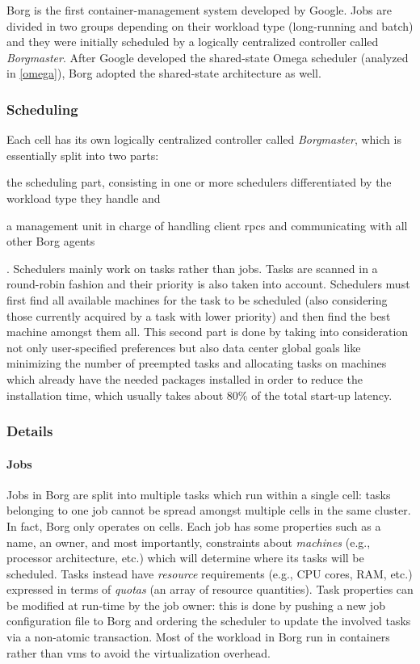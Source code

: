 Borg \cite{borg} is the first container-management system developed by Google.
Jobs are divided in two groups depending on their workload type (long-running and batch) and they were initially scheduled by a logically centralized controller called \textit{Borgmaster}.
After Google developed the shared-state Omega \cite{omega} scheduler (analyzed in \autoref{omega}), Borg \cite{borg} adopted the shared-state architecture as well.

\subsubsection{Scheduling}
Each cell has its own logically centralized controller called \textit{Borgmaster}, which is essentially split into two parts:
\begin{mylist}
    \item the scheduling part, consisting in one or more schedulers differentiated by the workload type they handle and
    \item a management unit in charge of handling client \glspl{rpc} and communicating with all other Borg \cite{borg} agents
\end{mylist}.
Schedulers mainly work on tasks rather than jobs.
Tasks are scanned in a round-robin fashion and their priority is also taken into account.
Schedulers must first find all available machines for the task to be scheduled (also considering those currently acquired by a task with lower priority) and then find the best machine amongst them all.
This second part is done by taking into consideration not only user-specified preferences but also data center global goals like minimizing the number of preempted tasks and allocating tasks on machines which already have the needed packages installed in order to reduce the installation time, which usually takes about 80\% of the total start-up latency.

\subsubsection{Details}

\paragraph{Jobs}
Jobs in Borg \cite{borg} are split into multiple tasks which run within a single cell: tasks belonging to one job cannot be spread amongst multiple cells in the same cluster.
In fact, Borg \cite{borg} only operates on cells.
Each job has some properties such as a name, an owner, and most importantly, constraints about \textit{machines} (e.g., processor architecture, etc.) which will determine where its tasks will be scheduled.
Tasks instead have \textit{resource} requirements (e.g., CPU cores, RAM, etc.) expressed in terms of \textit{quotas} (an array of resource quantities).
Task properties can be modified at run-time by the job owner: this is done by pushing a new job configuration file to Borg \cite{borg} and ordering the scheduler to update the involved tasks via a non-atomic transaction.
Most of the workload in Borg \cite{borg} run in containers rather than \glspl{vm} to avoid the virtualization overhead.

